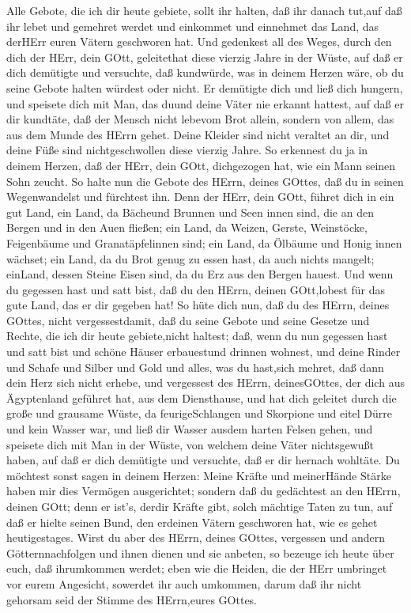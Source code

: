  Alle Gebote, die ich dir heute gebiete, sollt ihr halten,
daß ihr danach tut,auf daß ihr lebet und gemehret werdet und einkommet
und einnehmet das Land, das derHErr euren Vätern geschworen hat.
 Und gedenkest all des Weges, durch den dich der HErr, dein
GOtt, geleitethat diese vierzig Jahre in der Wüste, auf daß er dich
demütigte und versuchte, daß kundwürde, was in deinem Herzen wäre, ob du
seine Gebote halten würdest oder nicht.  Er demütigte dich
und ließ dich hungern, und speisete dich mit Man, das duund deine Väter
nie erkannt hattest, auf daß er dir kundtäte, daß der Mensch nicht
lebevom Brot allein, sondern von allem, das aus dem Munde des HErrn
gehet.  Deine Kleider sind nicht veraltet an dir, und deine
Füße sind nichtgeschwollen diese vierzig Jahre.  So
erkennest du ja in deinem Herzen, daß der HErr, dein GOtt, dichgezogen
hat, wie ein Mann seinen Sohn zeucht.  So halte nun die
Gebote des HErrn, deines GOttes, daß du in seinen Wegenwandelst und
fürchtest ihn.  Denn der HErr, dein GOtt, führet dich in ein
gut Land, ein Land, da Bächeund Brunnen und Seen innen sind, die an den
Bergen und in den Auen fließen;  ein Land, da Weizen,
Gerste, Weinstöcke, Feigenbäume und Granatäpfelinnen sind; ein Land, da
Ölbäume und Honig innen wächset;  ein Land, da du Brot genug
zu essen hast, da auch nichts mangelt; einLand, dessen Steine Eisen
sind, da du Erz aus den Bergen hauest.  Und wenn du
gegessen hast und satt bist, daß du den HErrn, deinen GOtt,lobest für
das gute Land, das er dir gegeben hat!  So hüte dich nun,
daß du des HErrn, deines GOttes, nicht vergessestdamit, daß du seine
Gebote und seine Gesetze und Rechte, die ich dir heute gebiete,nicht
haltest;  daß, wenn du nun gegessen hast und satt bist und
schöne Häuser erbauestund drinnen wohnest,  und deine
Rinder und Schafe und Silber und Gold und alles, was du hast,sich
mehret,  daß dann dein Herz sich nicht erhebe, und
vergessest des HErrn, deinesGOttes, der dich aus Ägyptenland geführet
hat, aus dem Diensthause,  und hat dich geleitet durch die
große und grausame Wüste, da feurigeSchlangen und Skorpione und eitel
Dürre und kein Wasser war, und ließ dir Wasser ausdem harten Felsen
gehen,  und speisete dich mit Man in der Wüste, von welchem
deine Väter nichtsgewußt haben, auf daß er dich demütigte und versuchte,
daß er dir hernach wohltäte.  Du möchtest sonst sagen in
deinem Herzen: Meine Kräfte und meinerHände Stärke haben mir dies
Vermögen ausgerichtet;  sondern daß du gedächtest an den
HErrn, deinen GOtt; denn er ist's, derdir Kräfte gibt, solch mächtige
Taten zu tun, auf daß er hielte seinen Bund, den erdeinen Vätern
geschworen hat, wie es gehet heutigestages.  Wirst du aber
des HErrn, deines GOttes, vergessen und andern Götternnachfolgen und
ihnen dienen und sie anbeten, so bezeuge ich heute über euch, daß
ihrumkommen werdet;  eben wie die Heiden, die der HErr
umbringet vor eurem Angesicht, sowerdet ihr auch umkommen, darum daß ihr
nicht gehorsam seid der Stimme des HErrn,eures GOttes.

